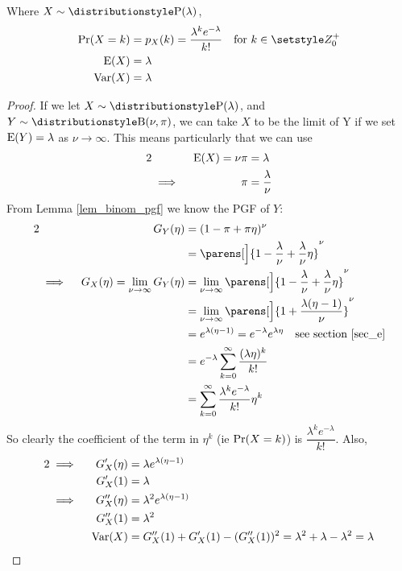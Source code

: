 \begin{theorem}
 Where \(X \sim \Poisson(\lambda)\),
 \begin{align*}
  \Prob(X = k) &= p_X(k) = \frac{\lambda^k e^{-\lambda}}{k!}
      \quad \text{for \(k \in \Integers^+_0\)} \\
  \Expect(X) &= \lambda \\
  \Var(X) &= \lambda
 \end{align*}
\end{theorem}
\begin{proof}
 If we let \(X \sim \Poisson(\lambda)\), and \(Y \sim \Binomial(\nu, \pi)\),
 we can take \(X\) to be the limit of Y if we set \(\operatorname{E}(Y) = \lambda\)
 as \(\nu \to \infty\). This means particularly that we can use
 \begin{alignat*}2
  && \Expect(X) = \nu \pi &= \lambda \\
  &\implies{}& \pi &= \frac \lambda \nu
 \end{alignat*}
 From Lemma \ref{lem_binom_pgf} we know the PGF of \(Y\):
 \begin{alignat*}2
  && G_Y(\eta) &= (1 - \pi + \pi \eta)^\nu \\
  &&  &= \parens[\Big]{1 - \frac \lambda \nu + \frac \lambda \nu \eta}^\nu \\
  &\implies{}& G_X(\eta) = \lim_{\nu \to \infty}G_Y(\eta)
      &= \lim_{\nu \to \infty} \parens[\Big]{1 - \frac \lambda \nu
                                  + \frac \lambda \nu \eta}^\nu \\
  &&  &= \lim_{\nu \to \infty} \parens[\Big]
      {1 + \frac{\lambda(\eta - 1)}\nu}^\nu \\
  &&  &= e^{\lambda(\eta - 1)} = e^{-\lambda}e^{\lambda \eta}
      \quad \text{see section \ref{sec_e}} \\
  &&  &= e^{-\lambda} \sum_{k = 0}^\infty \frac{(\lambda \eta)^k}{k!} \\
  &&  &= \sum_{k = 0}^\infty \frac{\lambda ^k e^{-\lambda}}{k!} \eta^k \\
 \end{alignat*}
  So clearly the coefficient of the term in \(\eta^k\) (ie \(\operatorname{Pr}(X = k)\))
  is \(\dfrac{\lambda^k e^{-\lambda}}{k!}\). Also,
  \begin{alignat*}2
  &\implies{}& G_X'(\eta) &= \lambda e^{\lambda(\eta - 1)} \\
  && G_X'(1) &= \lambda \\
  &\implies{}& G_X''(\eta) &= \lambda^2 e^{\lambda(\eta - 1)} \\
  && G_X''(1) &= \lambda^2 \\
  && \Var(X) &= G_X''(1) + G_X'(1) - (G_X''(1))^2
      = \lambda^2 + \lambda - \lambda^2 = \lambda \qedhere
 \end{alignat*}
\end{proof}


